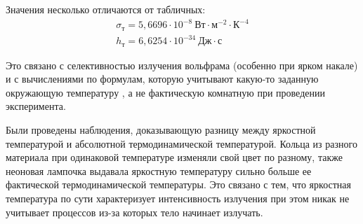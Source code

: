 \documentclass[a4paper, 12pt]{article}
\begin{document}
Значения несколько отличаются от табличных:
\begin{equation*}
    \begin{gathered}
        \sigma_\text{т} = 5,6696 \cdot 10 ^{-8}\: \text{Вт} \cdot \text{м}
        ^{-2} \cdot \text{К} ^{-4}\\
        h_\text{т} = 6,6254 \cdot 10 ^{-34}\: \text{Дж} \cdot \text{с}
    \end{gathered}
\end{equation*}

Это связано с селективностью излучения вольфрама (особенно при ярком
накале) и с вычислениями по формулам, которую учитывают какую-то заданную окружающую
температуру , а не фактическую комнатную при проведении
эксперимента.

Были проведены наблюдения, доказывающую разницу между яркостной
температурой и абсолютной термодинамической температурой. Кольца из
разного материала при одинаковой температуре изменяли свой цвет по
разному, также неоновая лампочка выдавала яркостную температуру сильно
больше ее фактической термодинамической температуры. Это связано с
тем, что яркостная температура по сути характеризует интенсивность
излучения при этом никак не учитывает процессов из-за которых тело
начинает излучать.    
\end{document}
